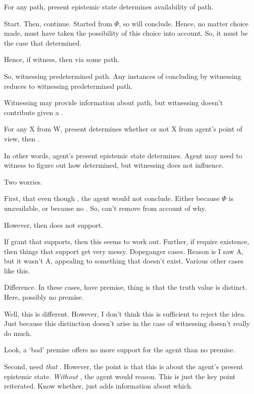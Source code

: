 \begin{note}
  \begin{proposition}
    For any path, present epistemic state determines availability of path.
  \end{proposition}

  Start.
  Then, continue.
  Started from \(\Phi\), so will conclude.
  Hence, no matter choice made, must have taken the possibility of this choice into account.
  So, it must be the case that determined.

  Hence, if witness, then via some path.

  So, witnessing predetermined path.
  Any instances of concluding by witnessing reduces to witnessing predetermined path.

  Witnessing may provide information about path, but witnessing doesn't contribute given a \requ{}.

  For any X from W,
  present determines whether or not X from agent's point of view, then \fc{}.

  In other words, agent's present epistemic state determines.
  Agent may need to witness to figure out how determined, but witnessing does not influence.
\end{note}

\begin{note}
  Two worries.

  First, that even though , the agent would not conclude.
  Either because \(\Phi\) is unavailable, or because no \pevent{}.
  So, can't remove  from account of why.

  However, then  does not support.

  If grant that  supports, then this seems to work out.
  Further, if require existence, then things that support get very messy.
  Dopeganger cases.
  Reason is I saw A, but it wasn't A, appealing to something that doesn't exist.
  Various other cases like this.

  Difference.
  In these cases, have premise, thing is that the truth value is distinct.
  Here, possibly no premise.

  Well, this is different.
  However, I don't think this is sufficient to reject the idea.
  Just because this distinction doesn't arise in the case of witnessing doesn't really do much.

  Look, a `bad' premise offers no more support for the agent than no premise.

  Second, need \emph{that} .
  However, the point is that this is about the agent's present epistemic state.
  \emph{Without} , the agent would reason.
  This is just the key point reiterated.
  Know whether,  just adds information about which.
\end{note}

